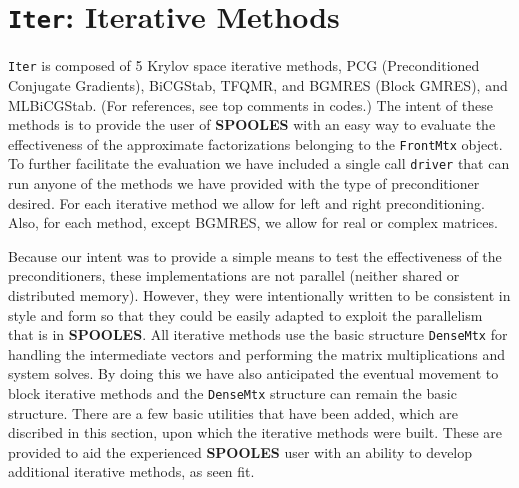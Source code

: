 \par
\chapter{{\tt Iter}: Iterative Methods}
\par
{\tt Iter} is composed of 5 Krylov space iterative methods, PCG (Preconditioned Conjugate
Gradients),  BiCGStab,  TFQMR, and BGMRES (Block GMRES), 
and MLBiCGStab. 
(For references, see top comments in codes.)
The intent of these methods is to provide the user of {\bf SPOOLES} with an
 easy way to evaluate the effectiveness of the approximate factorizations belonging
to the {\tt FrontMtx} object.  To further facilitate the evaluation we have included
a single call {\tt driver} that can run anyone of the methods we have provided with the
type of preconditioner desired.  For each iterative method we allow for left and right 
preconditioning.  Also, for each method, except BGMRES, we allow for real or
complex matrices.
\par
Because our intent was to provide a simple means to test the effectiveness of the
preconditioners, these implementations are not parallel (neither shared or distributed
memory).  However, they were intentionally written to be consistent in style and form
so that they could be easily adapted to exploit the parallelism that is in {\bf SPOOLES}.
All iterative methods use the basic structure {\tt DenseMtx} for handling the intermediate
vectors and performing the matrix multiplications and system solves.  By doing this
we have also anticipated the eventual movement to block iterative methods and the
{\tt DenseMtx} structure can remain the basic structure.  There are a few basic
utilities that have been added, which are discribed in this section, upon which the
iterative methods were built.  These are provided to aid the experienced {\bf SPOOLES} 
user with an ability to develop additional iterative methods, as seen fit.


